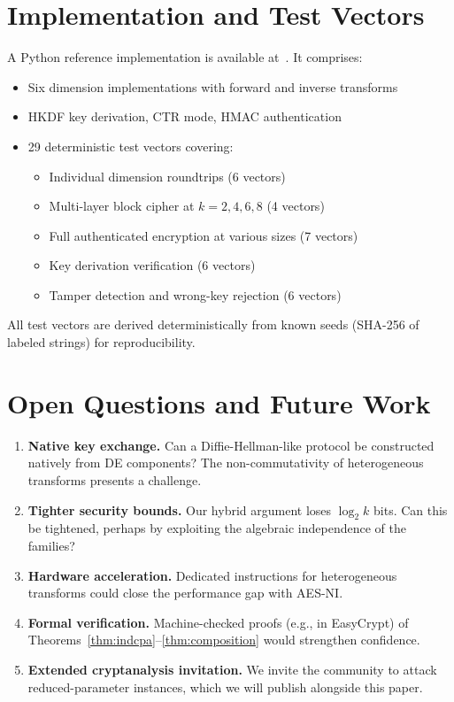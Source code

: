 \documentclass[11pt]{article}
\newcommand{\DE}{\textsf{DE}}
\begin{document}
\section{Implementation and Test Vectors}
\label{sec:implementation}

A Python reference implementation is available at~\cite{de-spec}. It
comprises:

\begin{itemize}[leftmargin=*]
\item Six dimension implementations with forward and inverse transforms
\item HKDF key derivation, CTR mode, HMAC authentication
\item 29 deterministic test vectors covering:
  \begin{itemize}
  \item Individual dimension roundtrips (6 vectors)
  \item Multi-layer block cipher at $k = 2, 4, 6, 8$ (4 vectors)
  \item Full authenticated encryption at various sizes (7 vectors)
  \item Key derivation verification (6 vectors)
  \item Tamper detection and wrong-key rejection (6 vectors)
  \end{itemize}
\end{itemize}

All test vectors are derived deterministically from known seeds
(SHA-256 of labeled strings) for reproducibility.

\section{Open Questions and Future Work}
\label{sec:future}

\begin{enumerate}[leftmargin=*]
\item \textbf{Native key exchange.} Can a Diffie-Hellman-like protocol
be constructed natively from \DE{} components? The non-commutativity of
heterogeneous transforms presents a challenge.

\item \textbf{Tighter security bounds.} Our hybrid argument loses
$\log_2 k$ bits. Can this be tightened, perhaps by exploiting the
algebraic independence of the families?

\item \textbf{Hardware acceleration.} Dedicated instructions for
heterogeneous transforms could close the performance gap with AES-NI.

\item \textbf{Formal verification.} Machine-checked proofs
(e.g., in EasyCrypt) of Theorems~\ref{thm:indcpa}--\ref{thm:composition}
would strengthen confidence.

\item \textbf{Extended cryptanalysis invitation.} We invite the community
to attack reduced-parameter instances, which we will publish alongside
this paper.
\end{enumerate}
\end{document}
